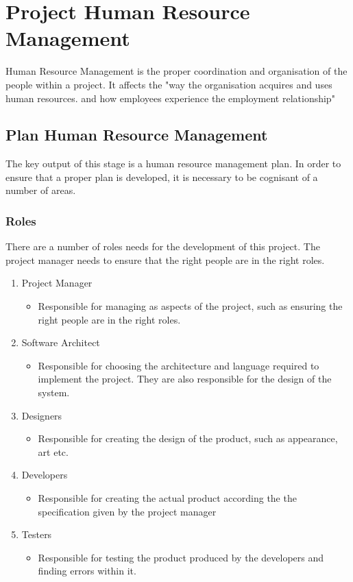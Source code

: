 \chapter{Project Human Resource Management}

Human Resource Management is the proper coordination and organisation of the people within a project. It affects the "way the organisation acquires and uses human resources. and how employees experience the employment relationship" \parencite{hr}

\section{Plan Human Resource Management}

The key output of this stage is a human resource management plan. In order to ensure that a proper plan is developed, it is necessary to be cognisant of a number of areas.

\subsection{Roles}

There are a number of roles needs for the development of this project. The project manager needs to ensure that the right people are in the right roles.

\begin{enumerate}
\item Project Manager
\begin{itemize}
\item Responsible for managing as aspects of the project, such as ensuring the right people are in the right roles.
\end{itemize}
\item Software Architect
\begin{itemize}
\item Responsible for choosing the architecture and language required to implement the project. They are also responsible for the design of the system.
\end{itemize}
\item Designers
\begin{itemize}
\item Responsible for creating the design of the product, such as appearance, art etc.
\end{itemize}
\item Developers
\begin{itemize}
\item Responsible for creating the actual product according the the specification given by the project manager
\end{itemize}
\item Testers
\begin{itemize}
\item Responsible for testing the product produced by the developers and finding errors within it.
\end{itemize}
\end{enumerate}

